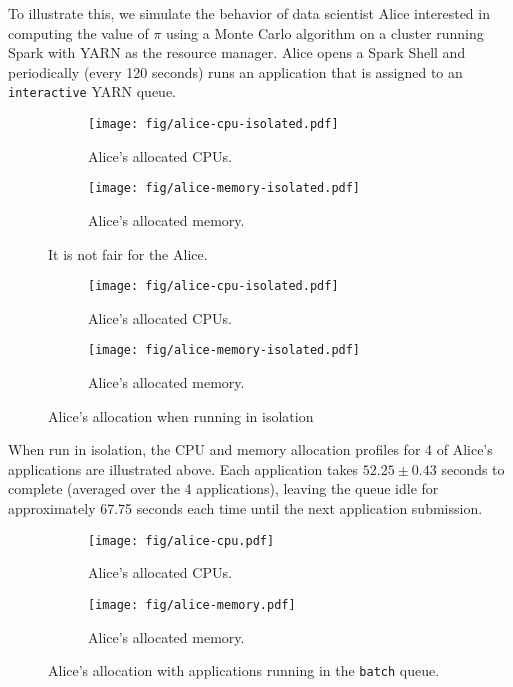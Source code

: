 To illustrate this, we simulate the behavior of data scientist Alice
interested in computing the value of $\pi$ using a Monte Carlo algorithm
on a cluster running Spark with YARN as the resource manager. Alice
opens a Spark Shell and periodically (every 120 seconds) runs an
application that is assigned to an \texttt{interactive} YARN queue.

\begin{figure}[h!]
	\centering
	\begin{subfigure}{0.45\textwidth}
		\texttt{[image: fig/alice-cpu-isolated.pdf]}
		\caption{Alice's allocated CPUs.}
	\end{subfigure}
	\begin{subfigure}{0.45\textwidth}
		\texttt{[image: fig/alice-memory-isolated.pdf]}
		\caption{Alice's allocated memory.}
	\end{subfigure}
	\caption{It is not fair for the Alice.}
\end{figure}

\begin{figure}[h!]
	\centering
	\begin{subfigure}{0.45\textwidth}
		\texttt{[image: fig/alice-cpu-isolated.pdf]}
		\caption{Alice's allocated CPUs.}
	\end{subfigure}
	\begin{subfigure}{0.45\textwidth}
		\texttt{[image: fig/alice-memory-isolated.pdf]}
		\caption{Alice's allocated memory.}
	\end{subfigure}
	\caption{Alice's allocation when running in isolation}
	\label{fig:alice-allocations-isolated}
\end{figure}

When run in isolation, the CPU and memory allocation profiles for 4 of
Alice's applications are illustrated above. Each application takes
$52.25 \pm 0.43$ seconds to complete (averaged over the 4 applications),
leaving the queue idle for approximately 67.75 seconds each time until
the next application submission.

\begin{figure}[h!]
	\centering
	\begin{subfigure}{0.45\textwidth}
		\texttt{[image: fig/alice-cpu.pdf]}
		\caption{Alice's allocated CPUs.}
	\end{subfigure}
	\begin{subfigure}{0.45\textwidth}
		\texttt{[image: fig/alice-memory.pdf]}
		\caption{Alice's allocated memory.}
	\end{subfigure}
	\caption{Alice's allocation with applications running in the
		\texttt{batch} queue.}
	\label{fig:alice-allocations}
\end{figure}

